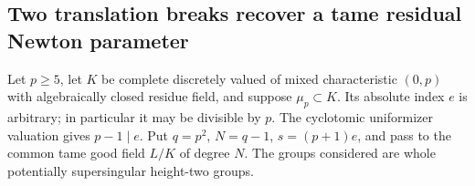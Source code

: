 \subsection{Two translation breaks recover a tame residual Newton parameter}

Let \(p\ge5\), let \(K\) be complete discretely valued of mixed
characteristic \((0,p)\) with algebraically closed residue field,
and suppose \(\mu_p\subset K\). Its absolute index \(e\) is
arbitrary; in particular it may be divisible by \(p\).
The cyclotomic uniformizer valuation gives \(p-1\mid e\).
Put \(q=p^2\), \(N=q-1\), \(s=(p+1)e\), and pass to
the common tame good field \(L/K\) of degree \(N\).
The groups considered are whole potentially supersingular
height-two groups.


